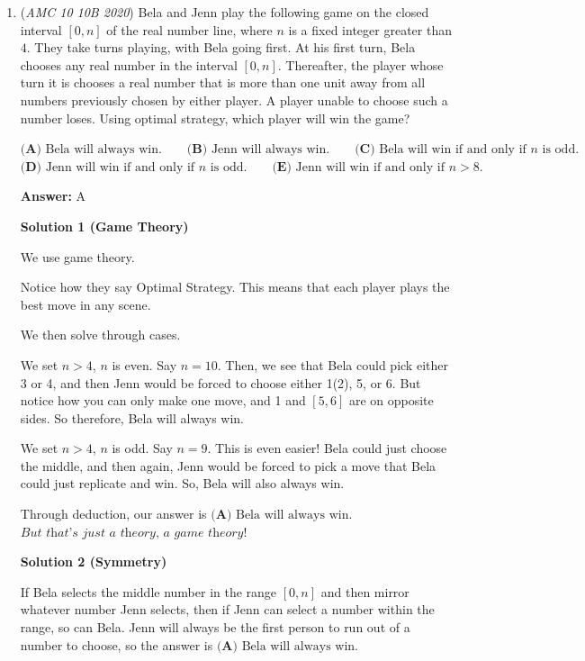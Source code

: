 \begin{enumerate}
 


	\item (\textit{AMC 10 10B 2020}) Bela and Jenn play the following game on the closed interval $[0, n]$ of the real number line, where $n$ is a fixed integer greater than $4$. They take turns playing, with Bela going first. At his first turn, Bela chooses any real number in the interval $[0, n]$. Thereafter, the player whose turn it is chooses a real number that is more than one unit away from all numbers previously chosen by either player. A player unable to choose such a number loses. Using optimal strategy, which player will win the game?


 $\textbf{(A)} \text{ Bela will always win.} \qquad \textbf{(B)} \text{ Jenn will always win.} \qquad \textbf{(C)} \text{ Bela will win if and only if }n \text{ is odd.}$
$\textbf{(D)} \text{ Jenn will win if and only if }n \text{ is odd.} \qquad \textbf{(E)} \text { Jenn will win if and only if } n>8.$

 \textbf{Answer: }A



\textbf{Solution 1 (Game Theory)}

We use game theory.

 Notice how they say Optimal Strategy. This means that each player plays the best move in any scene.

 We then solve through cases.

 We set \( n > 4 \), \( n \) is even. Say \( n = 10 \). Then, we see that Bela could pick either 3 or 4, and then Jenn would be forced to choose either 1(2), 5, or 6. But notice how you can only make one move, and 1 and \( [5,6] \) are on opposite sides. So therefore, Bela will always win.

 We set \( n > 4 \), \( n \) is odd. Say \( n = 9 \). This is even easier! Bela could just choose the middle, and then again, Jenn would be forced to pick a move that Bela could just replicate and win. So, Bela will also always win.

 Through deduction, our answer is $\boxed{\textbf{(A)} \text{ Bela will always win.}}$
$\textit{But that's just a theory, a game theory!}$




\textbf{Solution 2 (Symmetry)}

If Bela selects the middle number in the range $[0, n]$ and then mirror whatever number Jenn selects, then if Jenn can select a number within the range, so can Bela. Jenn will always be the first person to run out of a number to choose, so the answer is $\boxed{\textbf{(A)} \text{ Bela will always win.}}$





\end{enumerate}
